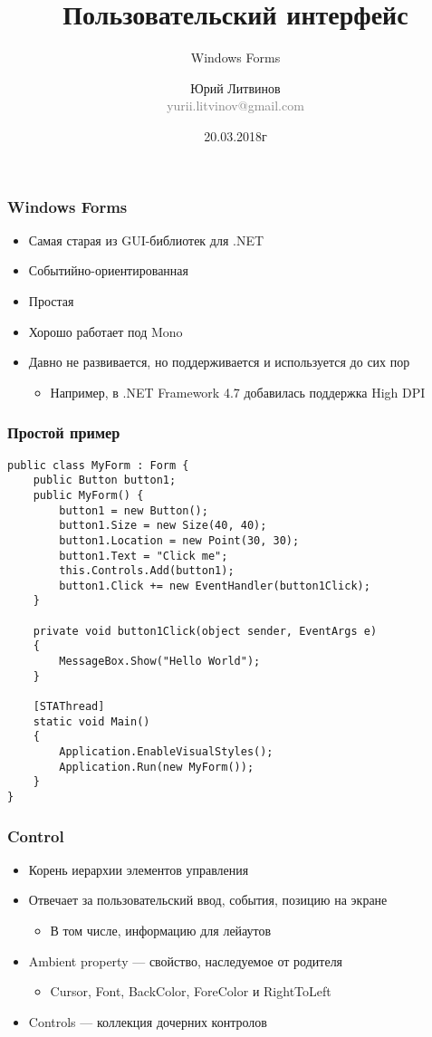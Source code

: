 \documentclass[xetex,mathserif,serif]{beamer}
\title{Пользовательский интерфейс}
\subtitle{Windows Forms}
\author[Юрий Литвинов]{Юрий Литвинов\\\small{\textcolor{gray}{yurii.litvinov@gmail.com}}}
\date{20.03.2018г}
\begin{document}
	\frame{\titlepage}

	\begin{frame}
		\frametitle{Windows Forms}
		\begin{itemize}
			\item Самая старая из GUI-библиотек для .NET
			\item Событийно-ориентированная
			\item Простая
			\item Хорошо работает под Mono
			\item Давно не развивается, но поддерживается и используется до сих пор
			\begin{itemize}
				\item Например, в .NET Framework 4.7 добавилась поддержка High DPI
			\end{itemize}
		\end{itemize}
	\end{frame}

	\begin{frame}[fragile]
		\frametitle{Простой пример}
		\begin{scriptsize}
			\begin{verbatim}
public class MyForm : Form {
    public Button button1;
    public MyForm() {
        button1 = new Button();
        button1.Size = new Size(40, 40);
        button1.Location = new Point(30, 30);
        button1.Text = "Click me";
        this.Controls.Add(button1);
        button1.Click += new EventHandler(button1Click);
    }

    private void button1Click(object sender, EventArgs e)
    {
        MessageBox.Show("Hello World");
    }

    [STAThread]
    static void Main()
    {
        Application.EnableVisualStyles();
        Application.Run(new MyForm());
    }
}
			\end{verbatim}
		\end{scriptsize}
	\end{frame}

	\begin{frame}
		\frametitle{Control}
		\begin{itemize}
			\item Корень иерархии элементов управления
			\item Отвечает за пользовательский ввод, события, позицию на экране
			\begin{itemize}
				\item В том числе, информацию для лейаутов
			\end{itemize}
			\item Ambient property --- свойство, наследуемое от родителя
			\begin{itemize}
				\item Cursor, Font, BackColor, ForeColor и RightToLeft
			\end{itemize}
			\item Controls --- коллекция дочерних контролов
		\end{itemize}
	\end{frame}
\end{document}
